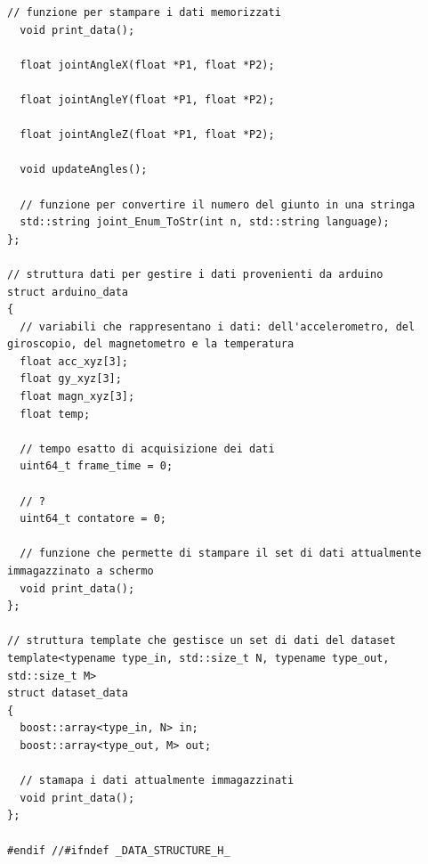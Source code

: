 \documentclass[10pt,a4paper]{article}
\begin{document}
\begin{lstlisting}[style=mycpp, caption=data\_structure.h, captionpos=b]
  // funzione per stampare i dati memorizzati
  void print_data();

  float jointAngleX(float *P1, float *P2);

  float jointAngleY(float *P1, float *P2);

  float jointAngleZ(float *P1, float *P2);

  void updateAngles();

  // funzione per convertire il numero del giunto in una stringa
  std::string joint_Enum_ToStr(int n, std::string language);
};

// struttura dati per gestire i dati provenienti da arduino
struct arduino_data
{
  // variabili che rappresentano i dati: dell'accelerometro, del giroscopio, del magnetometro e la temperatura
  float acc_xyz[3];
  float gy_xyz[3];
  float magn_xyz[3];
  float temp;

  // tempo esatto di acquisizione dei dati
  uint64_t frame_time = 0;

  // ?
  uint64_t contatore = 0;

  // funzione che permette di stampare il set di dati attualmente immagazzinato a schermo 
  void print_data();
};

// struttura template che gestisce un set di dati del dataset
template<typename type_in, std::size_t N, typename type_out, std::size_t M>
struct dataset_data
{
  boost::array<type_in, N> in;
  boost::array<type_out, M> out;

  // stamapa i dati attualmente immagazzinati
  void print_data();
};

#endif //#ifndef _DATA_STRUCTURE_H_
\end{lstlisting}
%
%
\end{document}

